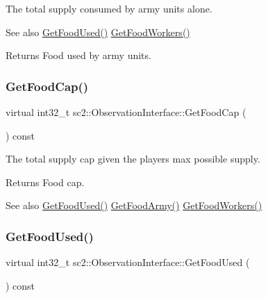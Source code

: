The total supply consumed by army units alone. \begin{DoxySeeAlso}{See also}
\hyperlink{classsc2_1_1_observation_interface_a77f230bd98b95599338c7788aee00d26}{Get\+Food\+Used()} \hyperlink{classsc2_1_1_observation_interface_a19f0bdd8df647ee935dbe6f3c50d64e7}{Get\+Food\+Workers()} 
\end{DoxySeeAlso}
\begin{DoxyReturn}{Returns}
Food used by army units. 
\end{DoxyReturn}
\mbox{\label{classsc2_1_1_observation_interface_ac556f665e6920eb853711c1b7d4d54b3}} 
\subsubsection{\texorpdfstring{Get\+Food\+Cap()}{GetFoodCap()}}
{\footnotesize\ttfamily virtual int32\+\_\+t sc2\+::\+Observation\+Interface\+::\+Get\+Food\+Cap (\begin{DoxyParamCaption}{ }\end{DoxyParamCaption}) const\hspace{0.3cm}{\ttfamily [pure virtual]}}

The total supply cap given the players max possible supply. \begin{DoxyReturn}{Returns}
Food cap. 
\end{DoxyReturn}
\begin{DoxySeeAlso}{See also}
\hyperlink{classsc2_1_1_observation_interface_a77f230bd98b95599338c7788aee00d26}{Get\+Food\+Used()} \hyperlink{classsc2_1_1_observation_interface_a7fd13a2a776f08f714d941ba9e4bafa8}{Get\+Food\+Army()} \hyperlink{classsc2_1_1_observation_interface_a19f0bdd8df647ee935dbe6f3c50d64e7}{Get\+Food\+Workers()} 
\end{DoxySeeAlso}
\mbox{\label{classsc2_1_1_observation_interface_a77f230bd98b95599338c7788aee00d26}} 
\subsubsection{\texorpdfstring{Get\+Food\+Used()}{GetFoodUsed()}}
{\footnotesize\ttfamily virtual int32\+\_\+t sc2\+::\+Observation\+Interface\+::\+Get\+Food\+Used (\begin{DoxyParamCaption}{ }\end{DoxyParamCaption}) const\hspace{0.3cm}{\ttfamily [pure virtual]}}

